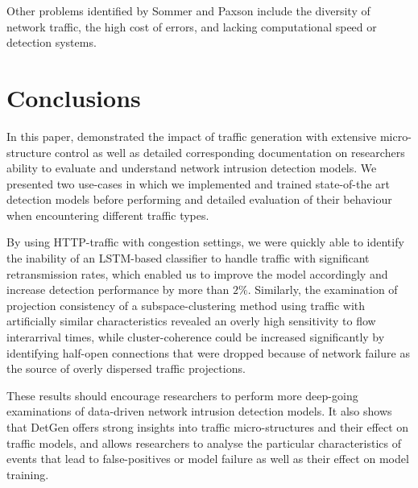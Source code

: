 \documentclass[conference]{IEEEtran}
\begin{document}
\vspace{0.2cm}
Other problems identified by Sommer and Paxson include the diversity of network traffic, the high cost of errors, and lacking computational speed or detection systems.


\section{Conclusions}\label{Sec:Conclusion}

In this paper, demonstrated the impact of traffic generation with extensive micro-structure control as well as detailed corresponding documentation on researchers ability to evaluate and understand network intrusion detection models. We presented two use-cases in which we implemented and trained state-of-the art detection models before performing and detailed evaluation of their behaviour when encountering different traffic types. 

By using HTTP-traffic with congestion settings, we were quickly able to identify the inability of an LSTM-based classifier to handle traffic with significant retransmission rates, which enabled us to improve the model accordingly and increase detection performance by more than $2\%$. Similarly, the examination of projection consistency of a subspace-clustering method using traffic with artificially similar characteristics revealed an overly high sensitivity to flow interarrival times, while cluster-coherence could be increased significantly by identifying half-open connections that were dropped because of network failure as the source of overly dispersed traffic projections. 

These results should encourage researchers to perform more deep-going examinations of data-driven network intrusion detection models. It also shows that DetGen offers strong insights into traffic micro-structures and their effect on traffic models, and allows researchers to analyse the particular characteristics of events that lead to false-positives or model failure as well as their effect on model training.


\end{document}
